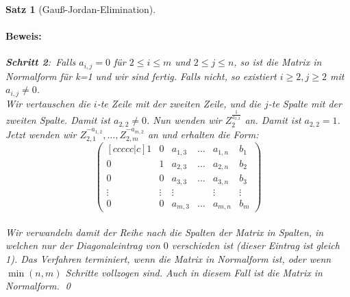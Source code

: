 \documentclass{report}
\theoremstyle{customrem}
\theoremstyle{customdef}
\newtheorem{satz}[definition]{Satz}
\renewenvironment{proof}{\paragraph{Beweis: }}{\qed}
\theoremstyle{customenv}
\begin{document}
\begin{satz}[Gauß-Jordan-Elimination]
\begin{proof}
			\textbf{Schritt 2}:\ Falls \(a_{i,j} = 0\) für \(2 \le i \le m\) und \(2 \le j \le n\), so ist die Matrix in Normalform für k=1 und wir sind fertig. Falls nicht, so existiert \(i \ge 2, j\ge 2\) mit \(a_{i,j} \neq 0\).\\
			Wir vertauschen die \(i\)-te Zeile mit der zweiten Zeile, und die \(j\)-te Spalte mit der zweiten Spalte. Damit ist \(a_{2,2} \neq 0\). Nun wenden wir \(Z_{2}^{\frac{1}{a_{2,2}}}\) an. Damit ist \(a_{2,2} = 1\). Jetzt wenden wir \(Z_{2,1}^{-a_{1,2}}, \dots, Z_{2,m}^{-a_{m,2}}\) an und erhalten die Form:
			\[
			\begin{pmatrix}[ccccc|c]
			1 		& 0 	& a_{1, 3}	& \dots	& a_{1, n} 	& b_1\\
			0 		& 1 	& a_{2, 3}	& \dots & a_{2, n} 	& b_2\\
			0 		& 0 	& a_{3, 3}	& \dots & a_{3, n}	& b_3\\
			\vdots	&\vdots	&\vdots		& 		& \vdots	& \vdots\\
			0 		& 0		& a_{m, 3} 	& \dots & a_{m, n} 	& b_m
			\end{pmatrix}
			\]\\
			Wir verwandeln damit der Reihe nach die Spalten der Matrix in Spalten, in welchen nur der Diagonaleintrag von \(0\) verschieden ist (dieser Eintrag ist gleich 1).
			Das Verfahren terminiert, wenn die Matrix in Normalform ist, oder wenn \(\min(n, m)\) Schritte vollzogen sind. Auch in diesem Fall ist die Matrix in Normalform.
		\end{proof}
	\end{satz}
\end{document}
